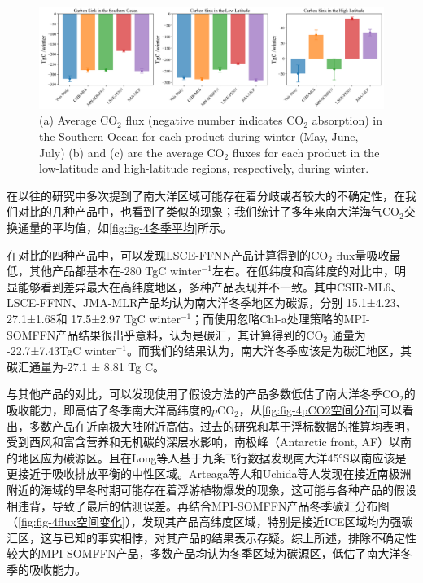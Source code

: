 \begin{figure}[htbp]
    \centering
    \includegraphics[width=\linewidth]{figure/第四章用图/567月结果.png}
    {(a) Average $\mathrm{CO_2}$ flux (negative number indicates $\mathrm{CO_2}$ absorption) in the Southern Ocean for each product during winter (May, June, July)  (b) and (c) are the average $\mathrm{CO_2}$ fluxes for each product in the low-latitude and high-latitude regions, respectively, during winter.}
\end{figure}
在以往的研究中多次提到了南大洋区域可能存在着分歧或者较大的不确定性，在我们对比的几种产品中，也看到了类似的现象；我们统计了多年来南大洋海气$\mathrm{CO_2}$交换通量的平均值，如\autoref{fig:fig-4冬季平均}所示。

在对比的四种产品中，可以发现LSCE-FFNN产品计算得到的$\mathrm{CO_2}$ flux量吸收最低，其他产品都基本在-280 TgC winter$^{-1}$左右。在低纬度和高纬度的对比中，明显能够看到差异最大在高纬度地区，多种产品表现并不一致。其中CSIR-ML6、LSCE-FFNN、JMA-MLR产品均认为南大洋冬季地区为碳源，分别 15.1±4.23、27.1±1.68和 17.5±2.97 TgC winter$^{-1}$；而使用忽略Chl-a处理策略的MPI-SOMFFN产品结果很出乎意料，认为是碳汇，其计算得到的$\mathrm{CO_2}$ 通量为 -22.7±7.43TgC winter$^{-1}$。而我们的结果认为，南大洋冬季应该是为碳汇地区，其碳汇通量为-27.1 ± 8.81 Tg C。

与其他产品的对比，可以发现使用了假设方法的产品多数低估了南大洋冬季$\mathrm{CO_2}$的吸收能力，即高估了冬季南大洋高纬度的$p\mathrm{CO_2}$，从\autoref{fig:fig-4pCO2空间分布}可以看出，多数产品在近南极大陆附近高估。过去的研究和基于浮标数据的推算均表明，受到西风和富含营养和无机碳的深层水影响，南极峰（Antarctic front, AF）以南的地区应为碳源区。且在Long等人\cite{long2021strong}基于九条飞行数据发现南大洋45°S以南应该是更接近于吸收排放平衡的中性区域。Arteaga等人\cite{arteaga2020seasonal}和Uchida等人\cite{uchida2019southern}发现在接近南极洲附近的海域的早冬时期可能存在着浮游植物爆发的现象，这可能与各种产品的假设相违背，导致了最后的估测误差。再结合MPI-SOMFFN产品冬季碳汇分布图（\autoref{fig:fig-4flux空间变化}），发现其产品高纬度区域，特别是接近ICE区域均为强碳汇区，这与已知的事实相悖，对其产品的结果表示存疑。综上所述，排除不确定性较大的MPI-SOMFFN产品，多数产品均认为冬季区域为碳源区，低估了南大洋冬季的吸收能力。

